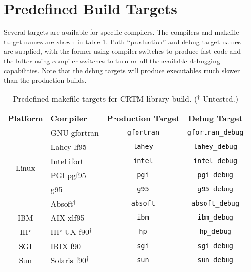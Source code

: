 \section{Predefined Build Targets}
Several targets are available for specific compilers. The compilers and makefile target names are shown in table \ref{tab:predefined_build_targets}. Both ``production'' and debug target names are supplied, with the former using compiler switches to produce fast code and the latter using compiler switches to turn on all the available debugging capabilities. Note that the debug targets will produce executables much slower than the production builds. 
\begin{table}[htp]
  \centering
  \begin{tabular}{clcc}
    \hline
    \sffamily\textbf{Platform} & \sffamily\textbf{Compiler} & \sffamily\textbf{Production Target} & \sffamily\textbf{Debug Target} \\
    \hline\hline
    \multirow{6}{*}{Linux} & GNU gfortran          & \texttt{gfortran} & \texttt{gfortran\_debug}\\
                           & Lahey lf95            & \texttt{lahey}    & \texttt{lahey\_debug}   \\
                           & Intel ifort           & \texttt{intel}    & \texttt{intel\_debug}   \\
                           & PGI pgf95             & \texttt{pgi}      & \texttt{pgi\_debug}     \\
                           & g95                   & \texttt{g95}      & \texttt{g95\_debug}     \\
                           & Absoft$^\dagger$      & \texttt{absoft}   & \texttt{absoft\_debug}  \\[0.2cm]
    IBM                    & AIX xlf95             & \texttt{ibm}      & \texttt{ibm\_debug}     \\[0.2cm]
    HP                     & HP-UX f90$^\dagger$   & \texttt{hp}       & \texttt{hp\_debug}      \\[0.2cm]
    SGI                    & IRIX f90$^\dagger$    & \texttt{sgi}      & \texttt{sgi\_debug}     \\[0.2cm]
    Sun                    & Solaris f90$^\dagger$ & \texttt{sun}      & \texttt{sun\_debug}     \\
    \hline
  \end{tabular}
  \caption{Predefined makefile targets for CRTM library build. ($^\dagger$ Untested.)}
  \label{tab:predefined_build_targets}
\end{table}

